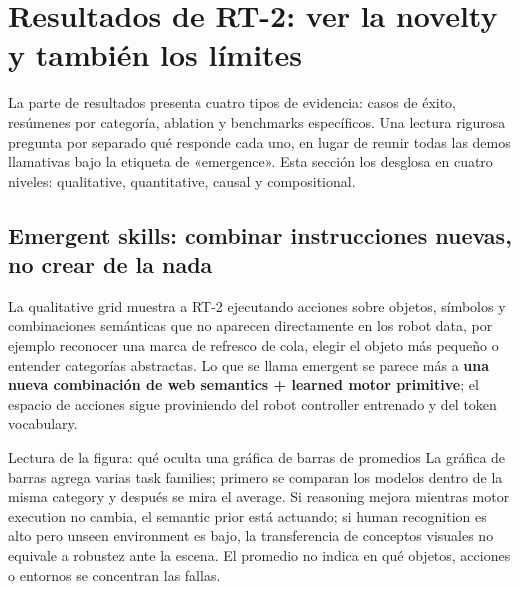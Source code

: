 \section{Resultados de RT-2: ver la novelty y también los límites}

La parte de resultados presenta cuatro tipos de evidencia: casos de éxito, resúmenes por categoría, ablation y benchmarks específicos. Una lectura rigurosa pregunta por separado qué responde cada uno, en lugar de reunir todas las demos llamativas bajo la etiqueta de «emergence». Esta sección los desglosa en cuatro niveles: qualitative, quantitative, causal y compositional.

\subsection{Emergent skills: combinar instrucciones nuevas, no crear de la nada}

La qualitative grid muestra a RT-2 ejecutando acciones sobre objetos, símbolos y combinaciones semánticas que no aparecen directamente en los robot data, por ejemplo reconocer una marca de refresco de cola, elegir el objeto más pequeño o entender categorías abstractas. Lo que se llama emergent se parece más a \textbf{una nueva combinación de web semantics + learned motor primitive}; el espacio de acciones sigue proviniendo del robot controller entrenado y del token vocabulary.



\begin{knowledgebox}{Lectura de la figura: qué oculta una gráfica de barras de promedios}
La gráfica de barras agrega varias task families; primero se comparan los modelos dentro de la misma category y después se mira el average. Si reasoning mejora mientras motor execution no cambia, el semantic prior está actuando; si human recognition es alto pero unseen environment es bajo, la transferencia de conceptos visuales no equivale a robustez ante la escena. El promedio no indica en qué objetos, acciones o entornos se concentran las fallas.
\end{knowledgebox}

